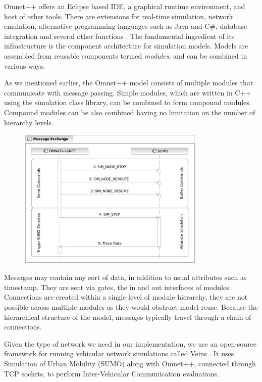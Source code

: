 Omnet++ offers an Eclipse based IDE, a graphical runtime environment, and host
of other tools. There are extensions for real-time simulation, network
emulation, alternative programming languages such as Java and C\#, database
integration and several other functions \cite{omnetpp}. The fundamental
ingredient of its infrastructure is the component architecture for simulation
models. Models are assembled from reusable components termed {\it modules}, and
can be combined in various ways.

As we mentioned earlier, the Omnet++ model consists of multiple modules that
communicate with message passing. Simple modules, which are written in C++ using
the simulation class library, can be combined to form compound modules. Compound
modules can be also combined having no limitation on the number of hierarchy
levels.

\begin{figure}[t]
	\centering
	\includegraphics[width=0.8\textwidth]{img/bidirectional_com}
\end{figure}

Messages may contain any sort of data, in addition to usual attributes such as
timestamp. They are sent via gates, the in and out interfaces of modules.
Connections are created within a single level of module hierarchy, they are not
possible across multiple modules as they would obstruct model reuse. Because the
hierarchical structure of the model, messages typically travel through a chain
of connections.

Given the type of network we need in our implementation, we use an
open-source framework for running vehicular network simulations called Veins \cite{veins}.
It uses Simulation of Urban Mobility (SUMO) along with Omnet++, connected
through TCP sockets, to perform Inter-Vehicular Communication evaluations.

